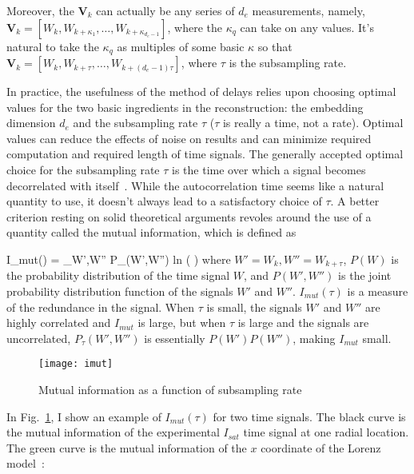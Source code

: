 Moreover, the ${\mathbf{V}}_k$ can actually be any series of $d_e$ measurements, namely, ${\mathbf{V}}_k = [W_k, W_{k + \kappa_1}, \ldots, W_{k + \kappa_{d_e-1}}]$, where the $\kappa_q$ can take on
any values. It's natural to take the $\kappa_q$ as multiples of some basic $\kappa$ so that ${\mathbf{V}}_k = [W_k, W_{k + \tau}, \ldots, W_{k + (d_e-1)\tau}]$, where $\tau$ is the subsampling
rate.

In practice, the usefulness of the method of delays relies upon choosing optimal values for the two basic ingredients in the reconstruction: 
the embedding dimension $d_e$ and the subsampling rate $\tau$ ($\tau$ is really a time, not a rate). 
Optimal values can reduce the effects of noise on results and can minimize required computation and required length of time signals.
The generally accepted optimal choice for the subsampling rate $\tau$ is the time over which a signal becomes decorrelated with itself~\cite{manneville2004,riedle2013}.
While the autocorrelation time seems like a natural quantity to use, it doesn't always lead to a satisfactory choice of $\tau$. A better criterion resting on solid theoretical arguments
revoles around the use of a quantity called the mutual information, which is defined as

\beq
\label{mutual_info}
I_{mut}(\tau) = \sum_{W',W''} P_{\tau}(W',W'') \rm{ln} \left(   \right)
\eeq
where $W' = W_k, W'' = W_{k+\tau}$, $P(W)$ is the probability distribution of the time signal $W$, and $P(W',W'')$ is the joint probability distribution function of the signals $W'$ and $W''$.
$I_{mut}(\tau)$ is a measure of the redundance in the signal. When $\tau$ is small, the signals $W'$ and $W''$ are highly correlated and $I_{mut}$ is large, but when $\tau$ is large and the
signals are uncorrelated, $P_{\tau}(W',W'')$ is essentially $P(W') P(W'')$, making $I_{mut}$ small.

\begin{figure}[!ht]
\centerline{\texttt{[image: imut]}}
\caption{Mutual information as a function of subsampling rate}
\label{imut}
\end{figure}

In Fig.~\ref{imut}, I show an example of $I_{mut}(\tau)$ for two time signals. The black curve is the mutual information of the experimental $I_{sat}$ time signal at one radial location.
The green curve is the mutual information of the $x$ coordinate of the Lorenz model~\cite{lorenz1963}:

